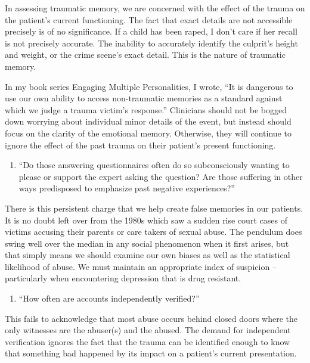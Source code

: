 \documentclass[]{book}
\providecommand{\tightlist}{%
  \setlength{\itemsep}{0pt}\setlength{\parskip}{0pt}}
\begin{document}
In assessing traumatic memory, we are concerned with the effect of the trauma on the patient's current functioning. The fact that exact details are not accessible precisely is of no significance. If a child has been raped, I don't care if her recall is not precisely accurate. The inability to accurately identify the culprit's height and weight, or the crime scene's exact detail. This is the nature of traumatic memory.

In my book series Engaging Multiple Personalities, I wrote, ``It is dangerous to use our own ability to access non-traumatic memories as a standard against which we judge a trauma victim's response.'' Clinicians should not be bogged down worrying about individual minor details of the event, but instead should focus on the clarity of the emotional memory. Otherwise, they will continue to ignore the effect of the past trauma on their patient's present functioning.

\begin{enumerate}
\def\labelenumi{\arabic{enumi}.}
\setcounter{enumi}{1}
\tightlist
\item
  ``Do those answering questionnaires often do so subconsciously wanting to please or support the expert asking the question? Are those suffering in other ways predisposed to emphasize past negative experiences?''
\end{enumerate}

There is this persistent charge that we help create false memories in our patients. It is no doubt left over from the 1980s which saw a sudden rise court cases of victims accusing their parents or care takers of sexual abuse. The pendulum does swing well over the median in any social phenomenon when it first arises, but that simply means we should examine our own biases as well as the statistical likelihood of abuse. We must maintain an appropriate index of suspicion -- particularly when encountering depression that is drug resistant.

\begin{enumerate}
\def\labelenumi{\arabic{enumi}.}
\setcounter{enumi}{2}
\tightlist
\item
  ``How often are accounts independently verified?''
\end{enumerate}

This fails to acknowledge that most abuse occurs behind closed doors where the only witnesses are the abuser(s) and the abused. The demand for independent verification ignores the fact that the trauma can be identified enough to know that something bad happened by its impact on a patient's current presentation.
\end{document}
